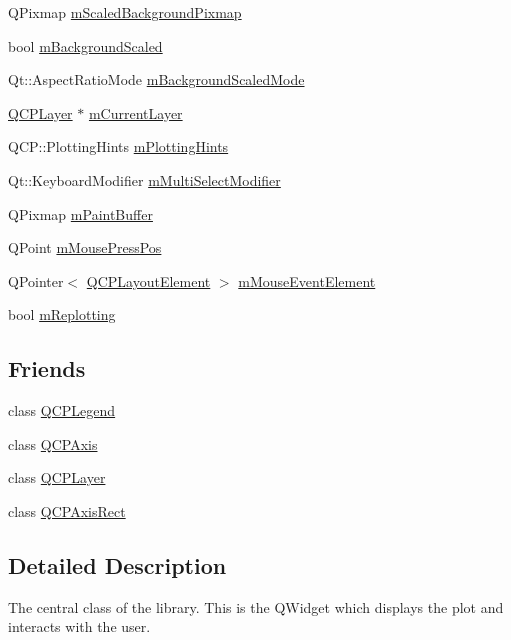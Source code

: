 \begin{DoxyCompactItemize}
\item 
Q\+Pixmap \hyperlink{class_q_custom_plot_a081bf046501d52642dc6d7e3bdb97d57}{m\+Scaled\+Background\+Pixmap}
\item 
bool \hyperlink{class_q_custom_plot_a62fe584b20680b1b2e1c7efb5c5416a5}{m\+Background\+Scaled}
\item 
Qt\+::\+Aspect\+Ratio\+Mode \hyperlink{class_q_custom_plot_ab82e8a5e3ad6b486f95d6da8bf49e9aa}{m\+Background\+Scaled\+Mode}
\item 
\hyperlink{class_q_c_p_layer}{Q\+C\+P\+Layer} $\ast$ \hyperlink{class_q_custom_plot_aa27569c92e74395af10151357d268628}{m\+Current\+Layer}
\item 
Q\+C\+P\+::\+Plotting\+Hints \hyperlink{class_q_custom_plot_aa184197a6101a9cc5807469e1d006c9e}{m\+Plotting\+Hints}
\item 
Qt\+::\+Keyboard\+Modifier \hyperlink{class_q_custom_plot_a0e97e701c5671e7e463d2ce0211d0f8a}{m\+Multi\+Select\+Modifier}
\item 
Q\+Pixmap \hyperlink{class_q_custom_plot_a753630df96e0672098d9e88bd41d1913}{m\+Paint\+Buffer}
\item 
Q\+Point \hyperlink{class_q_custom_plot_ac57090da95056ae4dd67be67adfa85bd}{m\+Mouse\+Press\+Pos}
\item 
Q\+Pointer$<$ \hyperlink{class_q_c_p_layout_element}{Q\+C\+P\+Layout\+Element} $>$ \hyperlink{class_q_custom_plot_a2f2e8b25e59cf3cf7b15e4767c02e747}{m\+Mouse\+Event\+Element}
\item 
bool \hyperlink{class_q_custom_plot_ab30daeca6612c3948afd368dce5f1c39}{m\+Replotting}
\end{DoxyCompactItemize}
\subsection*{Friends}
\begin{DoxyCompactItemize}
\item 
class \hyperlink{class_q_custom_plot_a8429035e7adfbd7f05805a6530ad5e3b}{Q\+C\+P\+Legend}
\item 
class \hyperlink{class_q_custom_plot_af123edeca169ec7a31958a1d714e1a8a}{Q\+C\+P\+Axis}
\item 
class \hyperlink{class_q_custom_plot_a5dbf96bf7664c1b6fce49063eeea6eef}{Q\+C\+P\+Layer}
\item 
class \hyperlink{class_q_custom_plot_acbf20ecb140f66c5fd1bc64ae0762990}{Q\+C\+P\+Axis\+Rect}
\end{DoxyCompactItemize}


\subsection{Detailed Description}
The central class of the library. This is the Q\+Widget which displays the plot and interacts with the user. 

